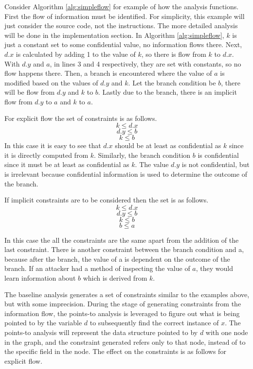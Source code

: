 \documentclass[11pt,a4paper]{article}
\begin{document}
Consider Algorithm \ref{alg:simpleflow} for example of how the analysis
functions. First the flow of information must be identified. For simplicity,
this example will just consider the source code, not the instructions. The more
detailed analysis will be done in the implementation section. In Algorithm
\ref{alg:simpleflow}, $k$ is just a constant set to some confidential value, no
information flows there. Next, $d.x$ is calculated by adding 1 to the value of $k$,
so there is flow from $k$ to $d.x$. With $d.y$ and $a$, in lines 3 and 4 respectively,
they are set with constants, so no flow happens there. Then, a branch is
encountered where the value of $a$ is modified based on the values of $d.y$ and
$k$. Let the branch condition be $b$, there will be flow from $d.y$ and $k$ to
$b$. Lastly due to the branch, there is an implicit flow from $d.y$ to $a$ and $k$ to
$a$.

For explicit flow the set of constraints is as follows.
\[
  k \leq d.x
\]
\[
  d.y \leq b
\]
\[
  k \leq b
\]
In this case it is easy to see that $d.x$ should be at least as confidential as $k$
since it is directly computed from $k$. Similarly, the branch condition $b$ is
confidential since it must be at least as confidential as $k$. The value $d.y$
is not confidential, but is irrelevant because confidential information is used
to determine the outcome of the branch. 

If implicit constraints are to be considered then the set is as follows.
\[
  k \leq d.x
\]
\[
  d.y \leq b
\]
\[
  k \leq b
\]
\[
  b \leq a
\]

In this case the all the constraints are the same apart from the addition of the
last constraint. There is another constraint between the branch condition and a,
because after the branch, the value of a is dependent on the outcome of the
branch. If an attacker had a method of inspecting the value of $a$, they would
learn information about $b$ which is derived from $k$.

The baseline analysis generates a set of constraints similar to the examples
above, but with some imprecision. During the stage of generating constraints
from the information flow, the points-to analysis is leveraged to figure out
what is being pointed to by the variable $d$ to subsequently find the correct
instance of $x$. The points-to analysis will represent the data structure
pointed to by $d$ with one node in the graph, and the constraint generated
refers only to that node, instead of to the specific field in the node. The
effect on the constraints is as follows for explicit flow.
\end{document}

